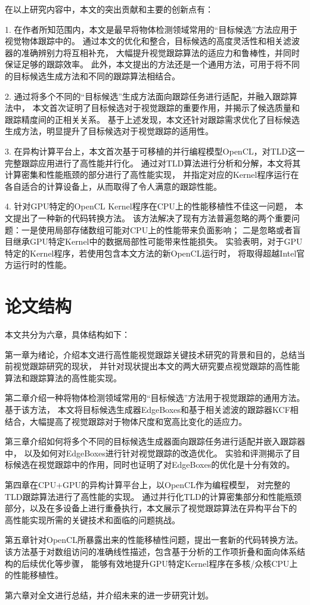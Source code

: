 在以上研究内容中，本文的突出贡献和主要的创新点有：
\begin{compactitem}
\item[1.]
在作者所知范围内，本文是最早将物体检测领域常用的``目标候选''方法应用于视觉物体跟踪中的。
通过本文的优化和整合，目标候选的高度灵活性和相关滤波器的准确辨别力将互相补充，
大幅提升视觉跟踪算法的适应力和鲁棒性，并同时保证足够的跟踪效率。
此外，本文提出的方法还是一个通用方法，可用于将不同的目标候选生成方法和不同的跟踪算法相结合。

\item[2.]
通过将多个不同的``目标候选''生成方法面向跟踪任务进行适配，并融入跟踪算法中，
本文首次证明了目标候选对于视觉跟踪的重要作用，并揭示了候选质量和跟踪精度间的正相关关系。
基于上述发现，本文还针对跟踪需求优化了目标候选生成方法，明显提升了目标候选对于视觉跟踪的适用性。

\item[3.]	
在异构计算平台上，本文首次基于可移植的并行编程模型OpenCL，对TLD这一完整跟踪应用进行了高性能并行化。
通过对TLD算法进行分析和分解，本文将其计算密集和性能瓶颈的部分进行了高性能实现，
并指定对应的Kernel程序运行在各自适合的计算设备上，从而取得了令人满意的跟踪性能。

\item[4.]	
针对GPU特定的OpenCL Kernel程序在CPU上的性能移植性不佳这一问题，
本文提出了一种新的代码转换方法。
该方法解决了现有方法普遍忽略的两个重要问题：一是使用局部存储数组可能对CPU上的性能带来负面影响；
二是忽略或者盲目继承GPU特定Kernel中的数据局部性可能带来性能损失。
实验表明，对于GPU特定的Kernel程序，若使用包含本文方法的新OpenCL运行时，
将取得超越Intel官方运行时的性能。
\end{compactitem}

\section{论文结构}
本文共分为六章，具体结构如下：

第一章为绪论，介绍本文进行高性能视觉跟踪关键技术研究的背景和目的，总结当前视觉跟踪研究的现状，
并针对现状提出本文的两大研究要点\pozhehao 视觉跟踪的高性能算法和跟踪算法的高性能实现。

第二章介绍一种将物体检测领域常用的``目标候选''方法用于视觉跟踪的通用方法。基于该方法，
本文将目标候选生成器EdgeBoxes和基于相关滤波的跟踪器KCF相结合，大幅提高了视觉跟踪对于物体尺度和宽高比变化的适应力。

第三章介绍如何将多个不同的目标候选生成器面向跟踪任务进行适配并嵌入跟踪器中，
以及如何对EdgeBoxes进行针对视觉跟踪的改造优化。
实验和评测揭示了目标候选在视觉跟踪中的作用，同时也证明了对EdgeBoxes的优化是十分有效的。

第四章在CPU+GPU的异构计算平台上，以OpenCL作为编程模型，
对完整的TLD跟踪算法进行了高性能的实现。
通过并行化TLD的计算密集部分和性能瓶颈部分，以及在多设备上进行重叠执行，本文展示了视觉跟踪算法在异构平台下的
高性能实现所需的关键技术和面临的问题挑战。

第五章针对OpenCL所暴露出来的性能移植性问题，提出一套新的代码转换方法。
该方法基于对数组访问的准确线性描述，包含基于分析的工作项折叠和面向体系结构的后续优化等步骤，
能够有效地提升GPU特定Kernel程序在多核/众核CPU上的性能移植性。

第六章对全文进行总结，并介绍未来的进一步研究计划。





